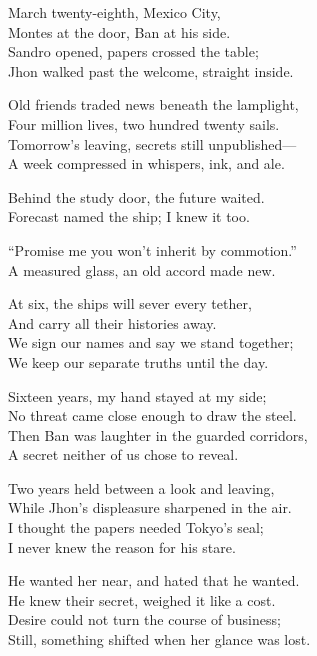 \begin{lyrics}
March twenty-eighth, Mexico City,\\
Montes at the door, Ban at his side.\\
Sandro opened, papers crossed the table;\\
Jhon walked past the welcome, straight inside.

Old friends traded news beneath the lamplight,\\
Four million lives, two hundred twenty sails.\\
Tomorrow’s leaving, secrets still unpublished—\\
A week compressed in whispers, ink, and ale.

Behind the study door, the future waited.\\
Forecast named the ship; I knew it too.

“Promise me you won’t inherit by commotion.”\\
A measured glass, an old accord made new.

At six, the ships will sever every tether,\\
And carry all their histories away.\\
We sign our names and say we stand together;\\
We keep our separate truths until the day.

Sixteen years, my hand stayed at my side;\\
No threat came close enough to draw the steel.\\
Then Ban was laughter in the guarded corridors,\\
A secret neither of us chose to reveal.

Two years held between a look and leaving,\\
While Jhon’s displeasure sharpened in the air.\\
I thought the papers needed Tokyo’s seal;\\
I never knew the reason for his stare.

He wanted her near, and hated that he wanted.\\
He knew their secret, weighed it like a cost.\\
Desire could not turn the course of business;\\
Still, something shifted when her glance was lost.


\end{lyrics}
